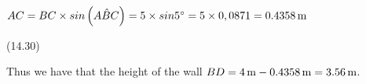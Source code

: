 {\begin{mdframed}[linewidth=4, leftmargin=40, rightmargin=40]
\begin{exercise}
\begin{enumerate}[noitemsep, label=\textbf{Step} \textbf{\arabic*}. ]
{      \addtolength{\mymathboxwidth}{-48pt}
    \par\vspace{12pt}\noindent\begin{minipage}{\columnwidth}
    \parbox[t]{\mymathboxwidth}{\large\begin{math}
    AC=BC\ensuremath{\times}sin\left(A\hat{B}C\right)=5\ensuremath{\times}sin{5}^{\circ }=5\ensuremath{\times}0,0871=0.4358\phantom{\rule{0.166667em}{0ex}}\mathrm{m}\end{math}}\hfill
    \parbox[t]{48pt}{\raggedleft 
    (14.30)}
    \end{minipage}\vspace{12pt}\par
    }%
        \label{m39411*id83338}Thus we have that the height of the wall \begin{math}BD=4\phantom{\rule{0.166667em}{0ex}}\mathrm{m}-0.4358\phantom{\rule{0.166667em}{0ex}}\mathrm{m}=3.56\phantom{\rule{0.166667em}{0ex}}\mathrm{m}\end{math}.
 \par 
        \end{enumerate}
    \end{exercise}
    \end{mdframed}
    }
    \noindent
\label{m39411*secfhsst!!!underscore!!!id1847}
